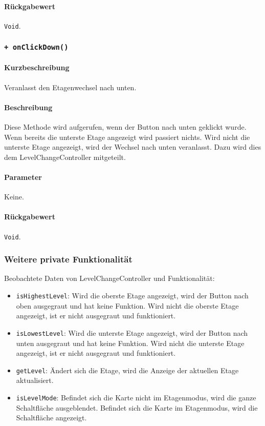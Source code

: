 \paragraph*{Rückgabewert}
\texttt{Void}.

\subsubsection*{\texttt{+ onClickDown()}}%
\paragraph*{Kurzbeschreibung}
Veranlasst den Etagenwechsel nach unten.
\paragraph*{Beschreibung}
Diese Methode wird aufgerufen, wenn der Button nach unten geklickt wurde. \\
Wenn bereits die unterste Etage angezeigt wird passiert nichts. 
Wird nicht die unterste Etage angezeigt, wird der Wechsel nach unten veranlasst.
Dazu wird dies dem LevelChangeController mitgeteilt.
\paragraph*{Parameter}
Keine.
\paragraph*{Rückgabewert}
\texttt{Void}.

\subsubsection*{Weitere private Funktionalität}%
Beobachtete Daten von LevelChangeController und Funktionalität:
\begin{itemize}
    \item \texttt{isHighestLevel}: Wird die oberste Etage angezeigt, wird der Button nach oben ausgegraut 
    und hat keine Funktion. Wird nicht die oberste Etage angezeigt, ist er nicht ausgegraut und funktioniert.
    \item \texttt{isLowestLevel}: Wird die unterste Etage angezeigt, wird der Button nach unten ausgegraut 
    und hat keine Funktion. Wird nicht die unterste Etage angezeigt, ist er nicht ausgegraut und funktioniert.
    \item \texttt{getLevel}: Ändert sich die Etage, wird die Anzeige der aktuellen Etage aktualisiert.
    \item \texttt{isLevelMode}: Befindet sich die Karte nicht im Etagenmodus, wird die ganze Schaltfläche ausgeblendet.
    Befindet sich die Karte im Etagenmodus, wird die Schaltfläche angezeigt.
\end{itemize}
